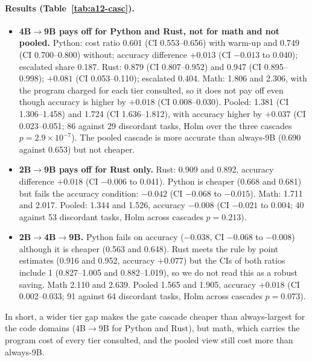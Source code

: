 \documentclass[11pt,a4paper]{article}
\begin{document}
\paragraph{Results (Table~\ref{tab:a12-casc}).}
\begin{itemize}
\item \textbf{4B$\to$9B pays off for Python and Rust, not for math and not pooled.} Python: cost ratio 0.601 (CI 0.553--0.656)
  with warm-up and 0.749 (CI 0.700--0.800) without; accuracy difference $+0.013$ (CI $-0.013$ to $0.040$); escalated share 0.187.
  Rust: 0.879 (CI 0.807--0.952) and 0.947 (CI 0.895--0.998); $+0.081$ (CI 0.053--0.110); escalated 0.404. Math: 1.806 and
  2.306, with the program charged for each tier consulted, so it does not pay off even though accuracy is higher by
  $+0.018$ (CI 0.008--0.030). Pooled: 1.381 (CI 1.306--1.458) and 1.724 (CI 1.636--1.812), with accuracy higher by $+0.037$
  (CI 0.023--0.051; 86 against 29 discordant tasks, Holm over the three cascades $p=2.9\times10^{-7}$). The pooled cascade is
  more accurate than always-9B (0.690 against 0.653) but not cheaper.
\item \textbf{2B$\to$9B pays off for Rust only.} Rust: 0.909 and 0.892, accuracy difference $+0.018$ (CI $-0.006$ to 0.041).
  Python is cheaper (0.668 and 0.681) but fails the accuracy condition: $-0.042$ (CI $-0.068$ to $-0.015$). Math: 1.711 and
  2.017. Pooled: 1.344 and 1.526, accuracy $-0.008$ (CI $-0.021$ to 0.004; 40 against 53 discordant tasks, Holm across cascades
  $p=0.213$).
\item \textbf{2B$\to$4B$\to$9B.} Python fails on accuracy ($-0.038$, CI $-0.068$ to $-0.008$) although it is cheaper (0.563 and
  0.648). Rust meets the rule by point estimates (0.916 and 0.952, accuracy $+0.077$) but the CIs of both ratios include 1
  (0.827--1.005 and 0.882--1.019), so we do not read this as a robust saving. Math 2.110 and 2.639. Pooled 1.565 and 1.905,
  accuracy $+0.018$ (CI 0.002--0.033; 91 against 64 discordant tasks, Holm across cascades $p=0.073$).
\end{itemize}
In short, a wider tier gap makes the gate cascade cheaper than always-largest for the code domains (4B$\to$9B for Python and
Rust), but math, which carries the program cost of every tier consulted, and the pooled view still cost more than always-9B.
\end{document}

